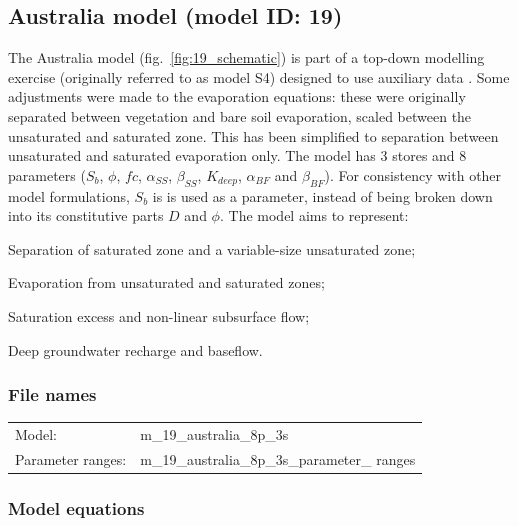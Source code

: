\subsection{Australia model (model ID: 19)}
The Australia model (fig.~\ref{fig:19_schematic}) is part of a top-down modelling exercise (originally referred to as model S4) designed to use auxiliary data \citep{Farmer2003}. 
Some adjustments were made to the evaporation equations: these were originally separated between vegetation and bare soil evaporation, scaled between the unsaturated and saturated zone. 
This has been simplified to separation between unsaturated and saturated evaporation only. 
The model has 3 stores and 8 parameters ($S_b$, $\phi$, $fc$, $\alpha_{SS}$, $\beta_{SS}$, $K_{deep}$,  $\alpha_{BF}$ and $\beta_{BF}$). 
For consistency with other model formulations, $S_b$ is is used as a parameter, instead of being broken down into its constitutive parts $D$ and $\phi$. 
The model aims to represent:

\begin{itemizecompact}
\item Separation of saturated zone and a variable-size unsaturated zone;
\item Evaporation from unsaturated and saturated zones;
\item Saturation excess and non-linear subsurface flow;
\item Deep groundwater recharge and baseflow.
\end{itemizecompact}

\subsubsection{File names}
\begin{tabular}{@{}ll}
Model: &m\_19\_australia\_8p\_3s \\
Parameter ranges: &m\_19\_australia\_8p\_3s\_parameter\_ ranges \\
\end{tabular}

\subsubsection{Model equations}

